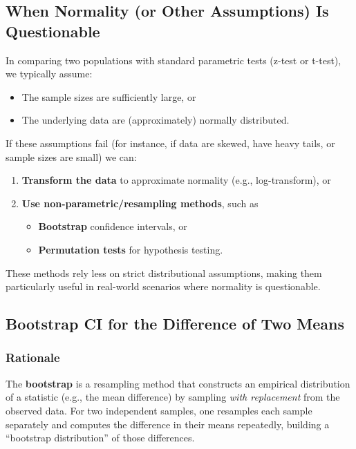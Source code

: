 \documentclass[10pt]{extarticle}
\begin{document}
\subsection{When Normality (or Other Assumptions) Is Questionable}

In comparing two populations with standard parametric tests (z-test or t-test), we typically assume:
\begin{itemize}
    \item The sample sizes are sufficiently large, or
    \item The underlying data are (approximately) normally distributed.
\end{itemize}
If these assumptions fail (for instance, if data are skewed, have heavy tails, or sample sizes are small) we can:
\begin{enumerate}
    \item \textbf{Transform the data} to approximate normality (e.g., log-transform), or
    \item \textbf{Use non-parametric/resampling methods}, such as
          \begin{itemize}
              \item \textbf{Bootstrap} confidence intervals, or
              \item \textbf{Permutation tests} for hypothesis testing.
          \end{itemize}
\end{enumerate}
These methods rely less on strict distributional assumptions, making them particularly useful in real-world scenarios where normality is questionable.

\subsection{Bootstrap CI for the Difference of Two Means}

\subsubsection{Rationale}
The \textbf{bootstrap} is a resampling method that constructs an empirical distribution of a statistic (e.g., the mean difference) by sampling \emph{with replacement} from the observed data. For two independent samples, one resamples each sample separately and computes the difference in their means repeatedly, building a “bootstrap distribution” of those differences.
\end{document}
